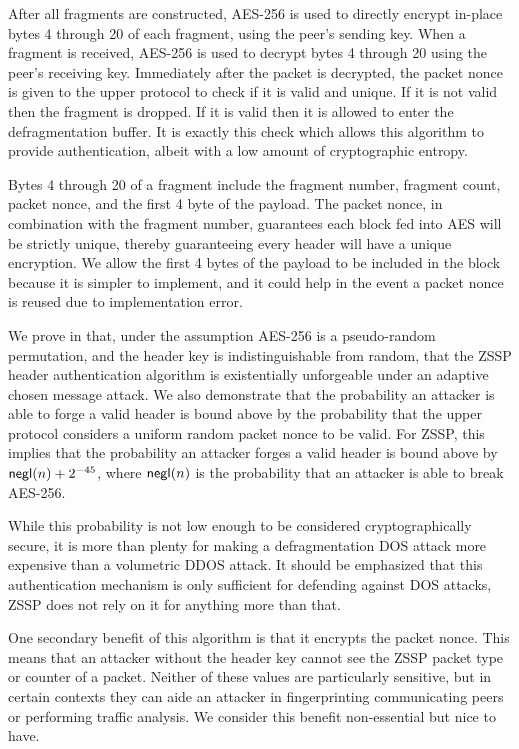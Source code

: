 \documentclass{article}
\begin{document}
After all fragments are constructed, AES-256 \cite{fips_aes} is used to directly encrypt in-place bytes 4 through 20 of each fragment, using the peer's sending key. When a fragment is received, AES-256 is used to decrypt bytes 4 through 20 using the peer's receiving key. Immediately after the packet is decrypted, the packet nonce is given to the upper protocol to check if it is valid and unique. If it is not valid then the fragment is dropped. If it is valid then it is allowed to enter the defragmentation buffer. It is exactly this check which allows this algorithm to provide authentication, albeit with a low amount of cryptographic entropy.

Bytes 4 through 20 of a fragment include the fragment number, fragment count, packet nonce, and the first 4 byte of the payload. The packet nonce, in combination with the fragment number, guarantees each block fed into AES will be strictly unique, thereby guaranteeing every header will have a unique encryption. We allow the first 4 bytes of the payload to be included in the block because it is simpler to implement, and it could help in the event a packet nonce is reused due to implementation error.

We prove in  that, under the assumption AES-256 is a pseudo-random permutation, and the header key is indistinguishable from random, that the ZSSP header authentication algorithm is existentially unforgeable under an adaptive chosen message attack. We also demonstrate that the probability an attacker is able to forge a valid header is bound above by the probability that the upper protocol considers a uniform random packet nonce to be valid. For ZSSP, this implies that the probability an attacker forges a valid header is bound above by $\text{\sf negl}(n) + 2^{-45}$, where $\text{\sf negl}(n)$ is the probability that an attacker is able to break AES-256.

While this probability is not low enough to be considered cryptographically secure, it is more than plenty for making a defragmentation DOS attack more expensive than a volumetric DDOS attack. It should be emphasized that this authentication mechanism is only sufficient for defending against DOS attacks, ZSSP does not rely on it for anything more than that.

One secondary benefit of this algorithm is that it encrypts the packet nonce. This means that an attacker without the header key cannot see the ZSSP packet type or counter of a packet. Neither of these values are particularly sensitive, but in certain contexts they can aide an attacker in fingerprinting communicating peers or performing traffic analysis. We consider this benefit non-essential but nice to have.
\end{document}

